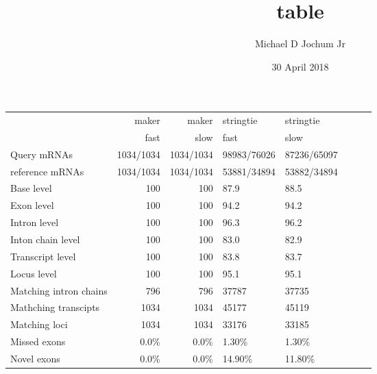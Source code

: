 \documentclass[11pt]{article}
\title{table}
\author{Michael D Jochum Jr}
\date{30 April 2018}
\begin{document}
\maketitle

\setcounter{tocdepth}{3}
\tableofcontents
\vspace*{1cm}

\begin{center}
\begin{tabular}{lrrlllll}
                         &      maker  &      maker  &  stringtie    &  stringtie    &     &     &     \\
                         &       fast  &       slow  &  fast         &  slow         &     &     &     \\
 Query mRNAs             &  1034/1034  &  1034/1034  &  98983/76026  &  87236/65097  &     &     &     \\
 reference mRNAs         &  1034/1034  &  1034/1034  &  53881/34894  &  53882/34894  &     &     &     \\
 Base level              &        100  &        100  &  87.9         &  88.5         &     &     &     \\
 Exon level              &        100  &        100  &  94.2         &  94.2         &     &     &     \\
 Intron level            &        100  &        100  &  96.3         &  96.2         &     &     &     \\
 Inton chain level       &        100  &        100  &  83.0         &  82.9         &     &     &     \\
 Transcript level        &        100  &        100  &  83.8         &  83.7         &     &     &     \\
 Locus level             &        100  &        100  &  95.1         &  95.1         &     &     &     \\
 Matching intron chains  &        796  &        796  &  37787        &  37735        &     &     &     \\
 Mathching transcipts    &       1034  &       1034  &  45177        &  45119        &     &     &     \\
 Matching loci           &       1034  &       1034  &  33176        &  33185        &     &     &     \\
 Missed exons            &      0.0\%  &      0.0\%  &  1.30\%       &  1.30\%       &     &     &     \\
 Novel exons             &      0.0\%  &      0.0\%  &  14.90\%      &  11.80\%      &     &     &     \\

\end{tabular}
\end{center}
\end{document}
